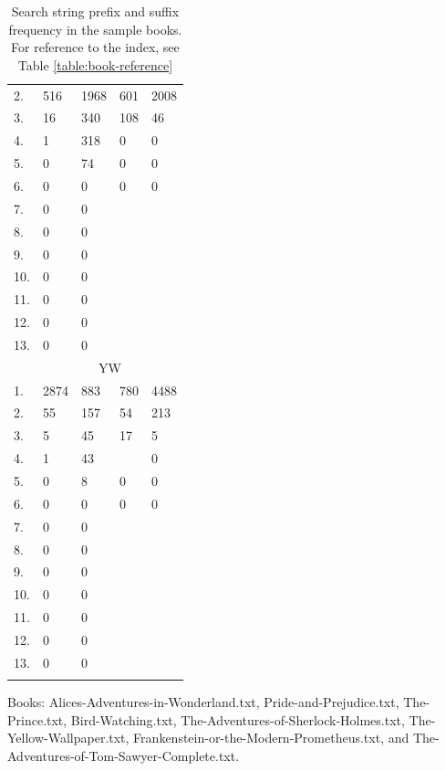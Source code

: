 \documentclass{article}
\begin{document}
\begin{longtable}{l|l|l||l|l}
    2. & 516 & 1968 & 601 & 2008\\
    3. & 16 & 340 & 108 & 46\\
    4. & 1 & 318 & 0 & 0\\
    5. & 0 & 74 & 0 & 0\\
    6. & 0 & 0 & 0 & 0\\
    7. & 0 & 0 & & \\
    8. & 0 & 0 & & \\
    9. & 0 & 0 & & \\
    10. & 0 & 0 & & \\
    11. & 0 & 0 & & \\
    12. & 0 & 0 & & \\
    13. & 0 & 0 & & \\
    \hline
    & \multicolumn{4}{c}{YW} \\
    \hline
    1. & 2874 & 883 & 780 & 4488\\
    2. & 55 & 157 & 54 & 213\\
    3. & 5 & 45 & 17 & 5\\
    4. & 1 & 43 & & 0\\
    5. & 0 & 8 & 0 & 0\\
    6. & 0 & 0 & 0 & 0\\
    7. & 0 & 0 & & \\
    8. & 0 & 0 & & \\
    9. & 0 & 0 & & \\
    10. & 0 & 0 & & \\
    11. & 0 & 0 & & \\
    12. & 0 & 0 & & \\
    13. & 0 & 0 & & \\
    \caption{Search string prefix and suffix frequency in the sample books. For reference to the index, see Table \ref{table:book-reference}}
    \label{table:books-prefix-suffix-frequency}
\end{longtable}



Books: Alices-Adventures-in-Wonderland.txt, Pride-and-Prejudice.txt, The-Prince.txt, Bird-Watching.txt, The-Adventures-of-Sherlock-Holmes.txt, The-Yellow-Wallpaper.txt, Frankenstein-or-the-Modern-Prometheus.txt, and The-Adventures-of-Tom-Sawyer-Complete.txt.

\end{document}
